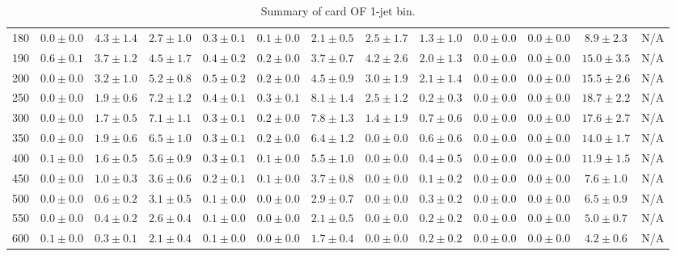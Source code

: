 \begin{table}
{\begin{center}
\begin{tabular}{l | c c | c c c c c c c c  | c c}
180 & $0.0\pm0.0$ & $4.3\pm1.4$ & $2.7\pm1.0$ & $0.3\pm0.1$ & $0.1\pm0.0$ & $2.1\pm0.5$ & $2.5\pm1.7$ & $1.3\pm1.0$ & $0.0\pm0.0$ & $0.0\pm0.0$ & $8.9\pm2.3$ & N/A \\
190 & $0.6\pm0.1$ & $3.7\pm1.2$ & $4.5\pm1.7$ & $0.4\pm0.2$ & $0.2\pm0.0$ & $3.7\pm0.7$ & $4.2\pm2.6$ & $2.0\pm1.3$ & $0.0\pm0.0$ & $0.0\pm0.0$ & $15.0\pm3.5$ & N/A \\
200 & $0.0\pm0.0$ & $3.2\pm1.0$ & $5.2\pm0.8$ & $0.5\pm0.2$ & $0.2\pm0.0$ & $4.5\pm0.9$ & $3.0\pm1.9$ & $2.1\pm1.4$ & $0.0\pm0.0$ & $0.0\pm0.0$ & $15.5\pm2.6$ & N/A \\
250 & $0.0\pm0.0$ & $1.9\pm0.6$ & $7.2\pm1.2$ & $0.4\pm0.1$ & $0.3\pm0.1$ & $8.1\pm1.4$ & $2.5\pm1.2$ & $0.2\pm0.3$ & $0.0\pm0.0$ & $0.0\pm0.0$ & $18.7\pm2.2$ & N/A \\
300 & $0.0\pm0.0$ & $1.7\pm0.5$ & $7.1\pm1.1$ & $0.3\pm0.1$ & $0.2\pm0.0$ & $7.8\pm1.3$ & $1.4\pm1.9$ & $0.7\pm0.6$ & $0.0\pm0.0$ & $0.0\pm0.0$ & $17.6\pm2.7$ & N/A \\
350 & $0.0\pm0.0$ & $1.9\pm0.6$ & $6.5\pm1.0$ & $0.3\pm0.1$ & $0.2\pm0.0$ & $6.4\pm1.2$ & $0.0\pm0.0$ & $0.6\pm0.6$ & $0.0\pm0.0$ & $0.0\pm0.0$ & $14.0\pm1.7$ & N/A \\
400 & $0.1\pm0.0$ & $1.6\pm0.5$ & $5.6\pm0.9$ & $0.3\pm0.1$ & $0.1\pm0.0$ & $5.5\pm1.0$ & $0.0\pm0.0$ & $0.4\pm0.5$ & $0.0\pm0.0$ & $0.0\pm0.0$ & $11.9\pm1.5$ & N/A \\
450 & $0.0\pm0.0$ & $1.0\pm0.3$ & $3.6\pm0.6$ & $0.2\pm0.1$ & $0.1\pm0.0$ & $3.7\pm0.8$ & $0.0\pm0.0$ & $0.1\pm0.2$ & $0.0\pm0.0$ & $0.0\pm0.0$ & $7.6\pm1.0$ & N/A \\
500 & $0.0\pm0.0$ & $0.6\pm0.2$ & $3.1\pm0.5$ & $0.1\pm0.0$ & $0.0\pm0.0$ & $2.9\pm0.7$ & $0.0\pm0.0$ & $0.3\pm0.2$ & $0.0\pm0.0$ & $0.0\pm0.0$ & $6.5\pm0.9$ & N/A \\
550 & $0.0\pm0.0$ & $0.4\pm0.2$ & $2.6\pm0.4$ & $0.1\pm0.0$ & $0.0\pm0.0$ & $2.1\pm0.5$ & $0.0\pm0.0$ & $0.2\pm0.2$ & $0.0\pm0.0$ & $0.0\pm0.0$ & $5.0\pm0.7$ & N/A \\
600 & $0.1\pm0.0$ & $0.3\pm0.1$ & $2.1\pm0.4$ & $0.1\pm0.0$ & $0.0\pm0.0$ & $1.7\pm0.4$ & $0.0\pm0.0$ & $0.2\pm0.2$ & $0.0\pm0.0$ & $0.0\pm0.0$ & $4.2\pm0.6$ & N/A \\
\hline
\end{tabular}
\end{center}
}
\caption{Summary of card OF 1-jet bin.}
\end{table}
